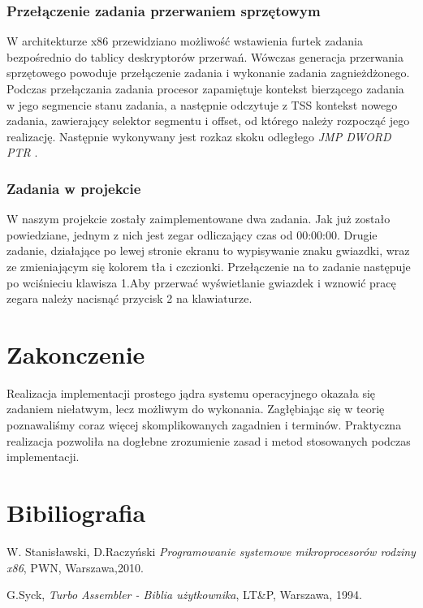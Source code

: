 \documentclass[a4paper,12pt]{article}
\begin{document}
			\subsubsection{Przełączenie zadania przerwaniem sprzętowym}
			 W architekturze x86 przewidziano możliwość wstawienia furtek zadania bezpośrednio do tablicy deskryptorów przerwań. Wówczas generacja przerwania sprzętowego powoduje przełączenie zadania i wykonanie zadania zagnieżdżonego. Podczas przełączania zadania procesor zapamiętuje kontekst bierzącego zadania w jego segmencie stanu zadania, a następnie odczytuje z TSS kontekst nowego zadania, zawierający selektor segmentu i offset, od którego należy rozpocząć jego realizację.  Następnie wykonywany jest rozkaz skoku odległego \textit{JMP DWORD PTR }.
 	
	\subsubsection{Zadania w projekcie}
		W naszym projekcie zostały zaimplementowane dwa zadania. Jak już zostało powiedziane, jednym z nich jest  zegar odliczający czas od 00:00:00. Drugie zadanie, działające po lewej stronie ekranu to wypisywanie znaku gwiazdki, wraz ze zmieniającym się kolorem tła i czczionki. Przełączenie na to zadanie następuje po wciśnieciu klawisza 1.Aby przerwać wyświetlanie gwiazdek i wznowić pracę zegara należy nacisnąć przycisk 2 na klawiaturze.
	
	
	\section{Zakonczenie}
		Realizacja implementacji prostego jądra systemu operacyjnego okazała się zadaniem niełatwym, lecz możliwym do wykonania. Zagłębiając się w teorię poznawaliśmy coraz więcej skomplikowanych zagadnien i  terminów.  Praktyczna realizacja pozwoliła na dogłebne zrozumienie zasad i metod stosowanych podczas implementacji. 
	
	\section{Bibiliografia}
\begin{thebibliography}{999}
 W. Stanisławski, D.Raczyński 
{\em Programowanie systemowe mikroprocesorów rodziny x86},
PWN, Warszawa,2010.

 G.Syck,
{\em Turbo Assembler - Biblia użytkownika}, 
LT\&P, Warszawa, 1994.



\end{thebibliography}	
\end{document}
